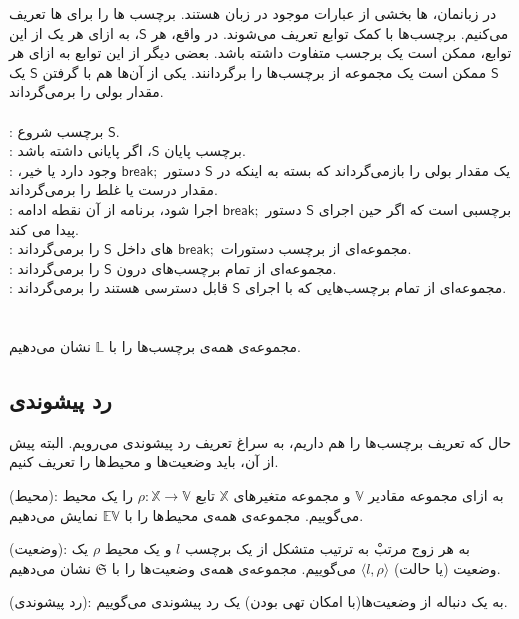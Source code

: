 در زبانمان، ها بخشی از عبارات موجود در زبان هستند. برچسب ها را برای ها تعریف می‌کنیم. برچسب‌ها با کمک توابع  تعریف می‌شوند. در‌ واقع، هر $\mathsf{S}$، به ازای هر یک از این توابع، ممکن است یک برجسب متفاوت داشته باشد. بعضی دیگر از این توابع به ازای هر $\mathsf{S}$ ممکن است یک مجموعه از برچسب‌ها را برگردانند. یکی از آن‌ها هم با گرفتن $\mathsf{S}$ یک مقدار بولی را بر‌می‌گرداند. 
\\\\
 : برچسب شروع $\mathsf{S}$.\\
 : برچسب پایان $\mathsf{S}$، اگر پایانی داشته باشد.\\
 : یک مقدار بولی را باز‌‌می‌گرداند که بسته به اینکه در $\mathsf{S}$ دستور $\mathsf{break;}$ وجود دارد یا خیر، مقدار درست یا غلط را بر‌می‌گرداند.\\
 : 
برچسبی است که اگر حین اجرای $\mathsf{S}$ دستور $\mathsf{break;}$ اجرا شود، برنامه از آن نقطه ادامه پیدا می کند.\\
 :
 مجموعه‌ای از برچسب دستورات
 $\mathsf{break;}$
  های داخل $\mathsf{S}$ را بر‌می‌گرداند.\\
 : مجموعه‌ای از تمام برچسب‌های درون $\mathsf{S}$ را برمی‌گرداند.\\
 : مجموعه‌ای از تمام بر‌چسب‌هایی که با اجرای $\mathsf{S}$ قابل دسترسی هستند را بر‌می‌گرداند.\\\\\\
مجموعه‌ی همه‌ی برچسب‌ها را با 
$\mathbb{L}$
نشان می‌دهیم.

\subsection{رد پیشوندی}


حال که تعریف برچسب‌ها را هم داریم، به سراغ تعریف رد پیشوندی می‌رویم. البته پیش از آن، باید وضعیت‌ها و محیط‌ها را تعریف کنیم.
\begin{defn}
	(محیط): به ازای مجموعه مقادیر $\mathbb{V}$ و مجموعه متغیرهای $\mathbb{X}$ تابع 
	$\rho : \mathbb{X} \rightarrow \mathbb{V}$ 
	را یک محیط می‌گوییم. مجموعه‌ی همه‌ی محیط‌ها را با $\mathbb{EV}$ نمایش می‌دهیم.
\end{defn}

\begin{defn}
	(وضعیت): به هر زوج مرتبْ به ترتیب متشکل از یک برچسب $l$ و یک محیط $\rho$ یک وضعیت (یا حالت)  
	$\langle l , \rho \rangle$
	می‌گوییم. مجموعه‌ی همه‌ی وضعیت‌ها را با $\mathfrak{S}$ نشان می‌دهیم.
\end{defn}
\begin{defn}
	(رد پیشوندی): به یک دنباله از وضعیت‌ها(با امکان تهی بودن) یک رد پیشوندی می‌گوییم.
\end{defn}

